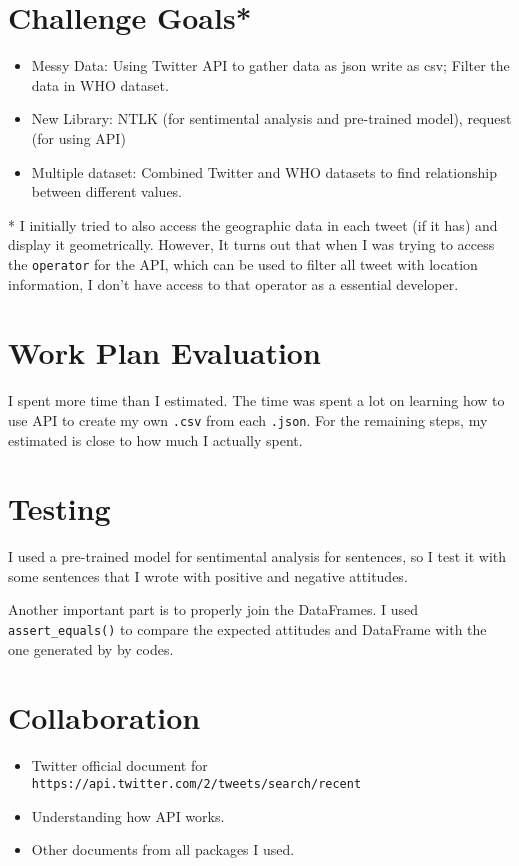 \documentclass[a4paper, 12pt]{article}
\begin{document}
\section*{Challenge Goals*}
\begin{itemize}
    \item Messy Data: Using Twitter API to gather data as json write as csv; Filter the data in WHO dataset.
    \item New Library: NTLK (for sentimental analysis and pre-trained model), request (for using API) 
    \item Multiple dataset: Combined Twitter and WHO datasets to find relationship between different values.
\end{itemize}
* I initially tried to also access the geographic data in each tweet (if it has) and display it geometrically. However, It turns out that when I was trying to access the \texttt{operator} for the API, which can be used to filter all tweet with location information, I don't have access to that operator as a essential developer.

\section*{Work Plan Evaluation}
I spent more time than I estimated. The time was spent a lot on learning how to use API to create my own \texttt{.csv} from each \texttt{.json}. For the remaining steps, my estimated is close to how much I actually spent. 

\section*{Testing}
I used a pre-trained model for sentimental analysis for sentences, so I test it with some sentences that I wrote with positive and negative attitudes. 

Another important part is to properly join the DataFrames. I used \texttt{assert\_equals()} to compare the expected attitudes and DataFrame with the one generated by by codes.

\section*{Collaboration}
\begin{itemize}
    \item Twitter official document for \texttt{https://api.twitter.com/2/tweets/search/recent}
    \item Understanding how API works.
    \item Other documents from all packages I used.
\end{itemize}
\end{document}
